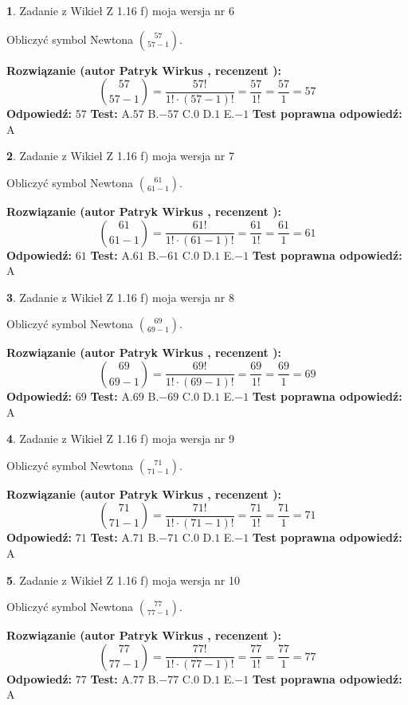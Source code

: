 \documentclass[12pt, a4paper]{article}
\theoremstyle{definition} %
\newtheorem{zad}{}
\newcommand{\zadStart}[1]{\begin{zad}#1\newline}
\newcommand{\zadStop}{\end{zad}}
\newcommand{\rozwStart}[2]{\noindent \textbf{Rozwiązanie (autor #1 , recenzent #2): }\newline}
\newcommand{\rozwStop}{\newline}
\newcommand{\odpStart}{\noindent \textbf{Odpowiedź:}\newline}
\newcommand{\odpStop}{\newline}
\newcommand{\testStart}{\noindent \textbf{Test:}\newline}
\newcommand{\testStop}{\newline}
\newcommand{\kluczStart}{\noindent \textbf{Test poprawna odpowiedź:}\newline}
\newcommand{\kluczStop}{\newline}
\begin{document}
\zadStart{Zadanie z Wikieł Z 1.16 f) moja wersja nr 6}

Obliczyć symbol Newtona ${57 \choose 57-1}$.
\zadStop
\rozwStart{Patryk Wirkus}{}
$${57 \choose 57-1} = \frac{57!}{1! \cdot (57-1)!} = \frac{57}{1!} = \frac{57}{1} = 57$$
\rozwStop
\odpStart
$57$
\odpStop
\testStart
A.$57$ B.$-57$ C.$0$ D.$1$ E.$-1$
\testStop
\kluczStart
A
\kluczStop



\zadStart{Zadanie z Wikieł Z 1.16 f) moja wersja nr 7}

Obliczyć symbol Newtona ${61 \choose 61-1}$.
\zadStop
\rozwStart{Patryk Wirkus}{}
$${61 \choose 61-1} = \frac{61!}{1! \cdot (61-1)!} = \frac{61}{1!} = \frac{61}{1} = 61$$
\rozwStop
\odpStart
$61$
\odpStop
\testStart
A.$61$ B.$-61$ C.$0$ D.$1$ E.$-1$
\testStop
\kluczStart
A
\kluczStop



\zadStart{Zadanie z Wikieł Z 1.16 f) moja wersja nr 8}

Obliczyć symbol Newtona ${69 \choose 69-1}$.
\zadStop
\rozwStart{Patryk Wirkus}{}
$${69 \choose 69-1} = \frac{69!}{1! \cdot (69-1)!} = \frac{69}{1!} = \frac{69}{1} = 69$$
\rozwStop
\odpStart
$69$
\odpStop
\testStart
A.$69$ B.$-69$ C.$0$ D.$1$ E.$-1$
\testStop
\kluczStart
A
\kluczStop



\zadStart{Zadanie z Wikieł Z 1.16 f) moja wersja nr 9}

Obliczyć symbol Newtona ${71 \choose 71-1}$.
\zadStop
\rozwStart{Patryk Wirkus}{}
$${71 \choose 71-1} = \frac{71!}{1! \cdot (71-1)!} = \frac{71}{1!} = \frac{71}{1} = 71$$
\rozwStop
\odpStart
$71$
\odpStop
\testStart
A.$71$ B.$-71$ C.$0$ D.$1$ E.$-1$
\testStop
\kluczStart
A
\kluczStop



\zadStart{Zadanie z Wikieł Z 1.16 f) moja wersja nr 10}

Obliczyć symbol Newtona ${77 \choose 77-1}$.
\zadStop
\rozwStart{Patryk Wirkus}{}
$${77 \choose 77-1} = \frac{77!}{1! \cdot (77-1)!} = \frac{77}{1!} = \frac{77}{1} = 77$$
\rozwStop
\odpStart
$77$
\odpStop
\testStart
A.$77$ B.$-77$ C.$0$ D.$1$ E.$-1$
\testStop
\kluczStart
A
\kluczStop
\end{document}
